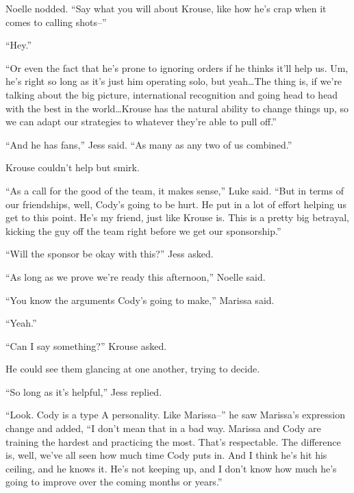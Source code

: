 Noelle nodded.  ``Say what you will about Krouse, like how he's crap when it comes to calling shots--''



``Hey.''



``Or even the fact that he's prone to ignoring orders if he thinks it'll help us.  Um, he's right so long as it's just him operating solo, but yeah\ldots The thing is, if we're talking about the big picture, international recognition and going head to head with the best in the world\ldots Krouse has the natural ability to change things up, so we can adapt our strategies to whatever they're able to pull off.''



``And he has fans,'' Jess said.  ``As many as any two of us combined.''



Krouse couldn't help but smirk.



``As a call for the good of the team, it makes sense,'' Luke said.  ``But in terms of our friendships, well, Cody's going to be hurt.  He put in a lot of effort helping us get to this point.  He's my friend, just like Krouse is.  This is a pretty big betrayal, kicking the guy off the team right before we get our sponsorship.''



``Will the sponsor be okay with this?'' Jess asked.



``As long as we prove we're ready this afternoon,'' Noelle said.



``You know the arguments Cody's going to make,'' Marissa said.



``Yeah.''



``Can I say something?''  Krouse asked.



He could see them glancing at one another, trying to decide.



``So long as it's helpful,'' Jess replied.



``Look.  Cody is a type A personality.  Like Marissa--'' he saw Marissa's expression change and added, ``I don't mean that in a bad way.  Marissa and Cody are training the hardest and practicing the most.  That's respectable.  The difference is, well, we've all seen how much time Cody puts in.  And I think he's hit his ceiling, and he knows it.  He's not keeping up, and I don't know how much he's going to improve over the coming months or years.''



